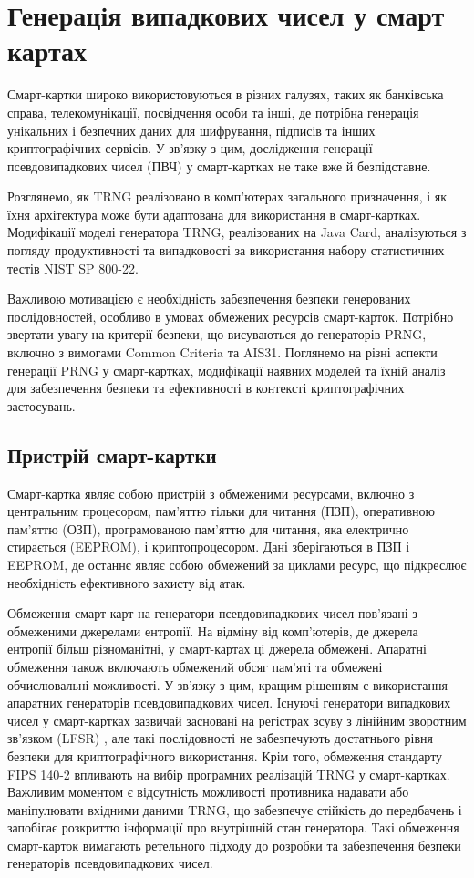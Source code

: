 \chapter{Генерація випадкових чисел у смарт картах}
\label{chap:theory}

Смарт-картки широко використовуються в різних галузях, таких як банківська справа, телекомунікації, посвідчення особи та інші, де потрібна генерація унікальних і безпечних даних для шифрування, підписів та інших криптографічних сервісів. У зв'язку з цим, дослідження генерації псевдовипадкових чисел (ПВЧ) у смарт-картках не таке вже й безпідставне. 


Розглянемо, як TRNG реалізовано в комп'ютерах загального призначення, і як їхня архітектура може бути адаптована для використання в смарт-картках. Модифікації моделі генератора TRNG, реалізованих на Java Card, аналізуються з погляду продуктивності та випадковості за використання набору статистичних тестів NIST SP 800-22.


Важливою мотивацією є необхідність забезпечення безпеки генерованих послідовностей, особливо в умовах обмежених ресурсів смарт-карток. Потрібно звертати увагу на критерії безпеки, що висуваються до генераторів PRNG, включно з вимогами Common Criteria та AIS31. Поглянемо на різні аспекти генерації PRNG у смарт-картках, модифікації наявних моделей та їхній аналіз для забезпечення безпеки та ефективності в контексті криптографічних застосувань.


\section{Пристрій смарт-картки}

Смарт-картка являє собою пристрій з обмеженими ресурсами, включно з центральним процесором, пам'яттю тільки для читання (ПЗП), оперативною пам'яттю (ОЗП), програмованою пам'яттю для читання, яка електрично стирається (EEPROM), і криптопроцесором. Дані зберігаються в ПЗП і EEPROM, де останнє являє собою обмежений за циклами ресурс, що підкреслює необхідність ефективного захисту від атак.


Обмеження смарт-карт на генератори псевдовипадкових чисел пов'язані з обмеженими джерелами ентропії. На відміну від комп'ютерів, де джерела ентропії більш різноманітні, у смарт-картах ці джерела обмежені. Апаратні обмеження також включають обмежений обсяг пам'яті та обмежені обчислювальні можливості. У зв'язку з цим, кращим рішенням є використання апаратних генераторів псевдовипадкових чисел. Існуючі генератори випадкових чисел у смарт-картках зазвичай засновані на регістрах зсуву з лінійним зворотним зв'язком (LFSR) \cite{kar2019general}, але такі послідовності не забезпечують достатнього рівня безпеки для криптографічного використання. Крім того, обмеження стандарту FIPS 140-2 впливають на вибір програмних реалізацій TRNG у смарт-картках. Важливим моментом є відсутність можливості противника надавати або маніпулювати вхідними даними TRNG, що забезпечує стійкість до передбачень і запобігає розкриттю інформації про внутрішній стан генератора. Такі обмеження смарт-карток вимагають ретельного підходу до розробки та забезпечення безпеки генераторів псевдовипадкових чисел.

